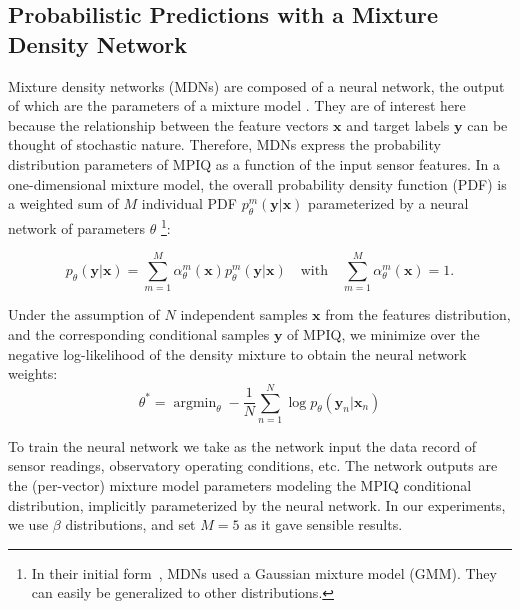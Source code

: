 \subsection{Probabilistic Predictions with a Mixture Density Network}
\label{sec:mdn}

Mixture density networks (MDNs) are composed of a neural network, the output of which are the parameters of a mixture model \citep{bishop_mdn}. They are of interest here because the relationship between the feature vectors $\mathbf{x}$ and target labels $\mathbf{y}$ can be thought of stochastic nature. Therefore, MDNs express the probability distribution parameters of MPIQ as a function of the input sensor features. In a one-dimensional mixture model, the overall probability density function (PDF) is a weighted sum of $M$ individual PDF $p_\theta^m(\mathbf{y}|\mathbf{x})$ parameterized by a neural network of parameters $\theta$ \footnote{In their initial form~\cite{bishop_mdn}, MDNs used a Gaussian mixture model (GMM). They can easily be generalized to other distributions.}:


\begin{equation*}
p_\theta(\mathbf{y}|\mathbf{x})=\sum_{m=1}^{M} \alpha_\theta^m(\mathbf{x}) p_\theta^m(\mathbf{y}|\mathbf{x}) \quad \textrm{with} \quad
\sum_{m=1}^{M} \alpha_\theta^m(\mathbf{x})=1.
\end{equation*}

Under the assumption of $N$ independent samples $\mathbf{x}$ from the features distribution, and the corresponding conditional samples $\mathbf{y}$ of MPIQ, we minimize over the negative log-likelihood of the density mixture to obtain the neural network weights:
\begin{equation}
\theta^* = \mathop{\mathrm{argmin}}_{\theta} -\frac{1}{N}\sum_{n=1}^{N} \log p_\theta(\mathbf{y}_n|\mathbf{x}_n)
\label{eqn:mdn_loss}
\end{equation}

To train the neural network we take as the network input the data record of sensor readings, observatory operating conditions, etc.  The network outputs are the (per-vector) mixture model parameters modeling the MPIQ conditional distribution, implicitly parameterized by the neural network. %
In our experiments, we use $\beta$ distributions, and set $M=5$ as it gave sensible results.

